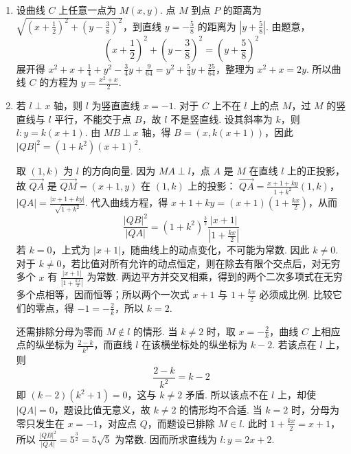 \begin{solution}
\begin{enumerate}
\item 设曲线 \(C\) 上任意一点为 \(M(x,y)\). 点 \(M\) 到点 \(P\) 的距离为 \(\sqrt{\left(x+\frac12\right)^2+\left(y-\frac38\right)^2}\)，到直线 \(y=-\frac58\) 的距离为 \(\left|y+\frac58\right|\). 由题意，
\[
\left(x+\frac12\right)^2+\left(y-\frac38\right)^2=\left(y+\frac58\right)^2
\]
展开得 \(x^2+x+\frac14+y^2-\frac34y+\frac9{64}=y^2+\frac54y+\frac{25}{64}\)，整理为 \(x^2+x=2y\). 所以曲线 \(C\) 的方程为 \(y=\frac{x^2+x}{2}\).

\item 若 \(l\perp x\) 轴，则 \(l\) 为竖直直线 \(x=-1\). 对于 \(C\) 上不在 \(l\) 上的点 \(M\)，过 \(M\) 的竖直线与 \(l\) 平行，不能交于点 \(B\)，故 \(l\) 不是竖直线. 设其斜率为 \(k\)，则 \(l:y=k(x+1)\). 由 \(MB\perp x\) 轴，得 \(B=(x,k(x+1))\)，因此 \(|QB|^2=(1+k^2)(x+1)^2\).

取 \((1,k)\) 为 \(l\) 的方向向量. 因为 \(MA\perp l\)，点 \(A\) 是 \(M\) 在直线 \(l\) 上的正投影，故 \(\overrightarrow{QA}\) 是 \(\overrightarrow{QM}=(x+1,y)\) 在 \((1,k)\) 上的投影：
\(\overrightarrow{QA}=\frac{x+1+ky}{1+k^2}(1,k)\)，\(|QA|=\frac{|x+1+ky|}{\sqrt{1+k^2}}\).
代入曲线方程，得 \(x+1+ky=(x+1)\left(1+\frac{kx}{2}\right)\)，从而
\[
\frac{|QB|^2}{|QA|}=(1+k^2)^{\frac{3}{2}}\frac{|x+1|}{\left|1+\frac{kx}{2}\right|}
\]
若 \(k=0\)，上式为 \(|x+1|\)，随曲线上的动点变化，不可能为常数. 因此 \(k\ne0\). 对于 \(k\ne0\)，若比值对所有允许的动点恒定，则在除去有限个交点后，对无穷多个 \(x\) 有 \(\frac{|x+1|}{|1+\frac{kx}{2}|}\) 为常数. 两边平方并交叉相乘，得到的两个二次多项式在无穷多个点相等，因而恒等；所以两个一次式 \(x+1\) 与 \(1+\frac{kx}{2}\) 必须成比例. 比较它们的零点，得 \(-1=-\frac2k\)，所以 \(k=2\).

还需排除分母为零而 \(M\notin l\) 的情形. 当 \(k\ne2\) 时，取 \(x=-\frac2k\)，曲线 \(C\) 上相应点的纵坐标为 \(\frac{2-k}{k^2}\)，而直线 \(l\) 在该横坐标处的纵坐标为 \(k-2\). 若该点在 \(l\) 上，则
\[
\frac{2-k}{k^2}=k-2
\]
即 \((k-2)(k^2+1)=0\)，这与 \(k\ne2\) 矛盾. 所以该点不在 \(l\) 上，却使 \(|QA|=0\)，题设比值无意义，故 \(k\ne2\) 的情形均不合适. 当 \(k=2\) 时，分母为零只发生在 \(x=-1\)，对应点 \(Q\)，而题设已排除 \(M\in l\). 此时 \(1+\frac{kx}{2}=x+1\)，所以 \(\frac{|QB|^2}{|QA|}=5^{\frac{3}{2}}=5\sqrt5\) 为常数. 因而所求直线为 \(l:y=2x+2\).
\end{enumerate}
\end{solution}
